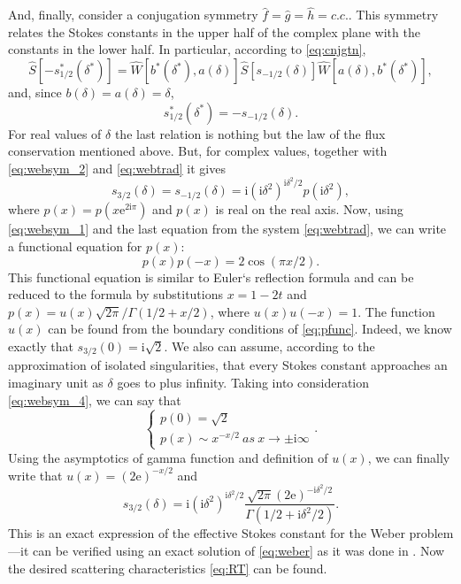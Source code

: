 \documentclass[atmp]{ipart_v1}
\def\rme{\mathrm{e}}
\def\rmi{\mathrm{i}}
\def\S{\widehat{S}}
\def\W{\widehat{W}}
\def\f{\hat{f}}
\def\g{\hat{g}}
\def\h{\hat{h}}
\newcommand\eref[1]{\eqref{#1}}
\begin{document}
And, finally, consider a conjugation symmetry $\f=\g=\h=c.c.$. This symmetry relates the 
Stokes constants in the upper half of the complex plane with the constants in the lower half. 
In particular, according to \eref{eq:cnjgtn},
\begin{equation}
\S \left[ -s_{1/2}^*(\delta^*) \right] = 
\W \left[ b^*(\delta^*),a(\delta) \right]
\S \left[ s_{-1/2}(\delta) \right]
\W \left[ a(\delta),b^*(\delta^*) \right],
\end{equation}
and, since $b(\delta)=a(\delta)=\delta$,
\begin{equation}
s_{1/2}^*(\delta^*)=-s_{-1/2}(\delta).
\label{eq:websym_3}
\end{equation}
For real values of $\delta$ the last relation is nothing but the law of the flux conservation 
mentioned above. But, for complex values, together with \eref{eq:websym_2} and \eref{eq:webtrad} 
it gives
\begin{equation}
s_{3/2}(\delta)=s_{-1/2}(\delta)=\rmi(\rmi \delta^2)^{\rmi \delta^2/2}p(\rmi \delta^2),
\label{eq:websym_4}
\end{equation}
where $p(x)=p(x \rme^{2\rmi\pi})$ and $p(x)$ is real on the real axis. Now, using \eref{eq:websym_1} 
and the last equation from the system \eref{eq:webtrad}, we can write a functional equation for $p(x)$:
\begin{equation}
p(x)p(-x)=2\cos(\pi x/2).
\label{eq:pfunc}
\end{equation}
This functional equation is similar to Euler`s reflection formula \cite{gamma} and can be reduced 
to the formula by substitutions $x=1-2t$ and $p(x)=u(x)\sqrt{2\pi}/\Gamma(1/2+x/2)$, where $u(x)u(-x)=1$. 
The function $u(x)$ can be found from the boundary conditions of \eref{eq:pfunc}. Indeed, we know 
exactly \cite{white} that $s_{3/2}(0)=\rmi\sqrt{2}$. We also can assume, according to the approximation of 
isolated singularities\cite{white,ours}, that every Stokes constant approaches an imaginary 
unit as $\delta$ goes to plus infinity. Taking into consideration \eref{eq:websym_4}, we can say that
\begin{equation}
\begin{cases} 
p(0) = \sqrt{2} \\
p(x) \sim x^{-x/2}\ as\ x \rightarrow \pm \rmi \infty 
\end{cases}.  
\end{equation}
Using the asymptotics of gamma function and definition of $u(x)$, we can finally write 
that $u(x)=(2 \rme)^{-x/2}$ and
\begin{equation}
s_{3/2}(\delta)=\rmi(\rmi\delta^2)^{\rmi\delta^2/2}
\frac{\sqrt{2\pi}(2\rme)^{-\rmi\delta^2/2}}{\Gamma(1/2+\rmi\delta^2/2)}.
\label{eq:s3/2}
\end{equation}
This is an exact expression of the effective Stokes constant for 
the Weber problem---it can be verified using 
an exact solution of \eref{eq:weber} as it was done in \cite{ours}. 
Now the desired scattering characteristics \eref{eq:RT} can be found.
\end{document}
